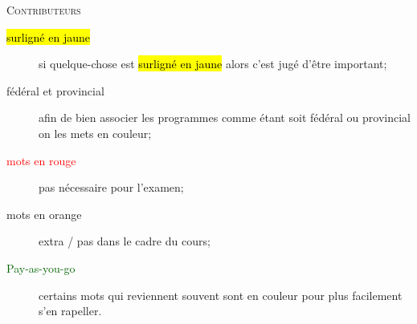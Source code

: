 \documentclass[10pt, french]{article}
\begin{document}
\begin{center}
	\textsc{\Large Contributeurs}\\[0.5cm] 
\end{center}


\begin{algo2}[Légende]
\begin{description}
	\item[\hl{surligné en jaune}]	si quelque-chose est \hl{surligné en jaune} alors c'est jugé d'être important; 
	\item[\textcolor{bulgarianrose}{fédéral} et \textcolor{blue(pigment)}{provincial}]	afin de bien associer les programmes comme étant soit \textcolor{bulgarianrose}{fédéral} ou \textcolor{blue(pigment)}{provincial} on les mets en couleur;
	\item[\textcolor{red}{mots en rouge}]	pas nécessaire pour l'examen;
	\item[\textcolor{burntorange}{mots en orange}]	extra / pas dans le cadre du cours;
	\item[\textcolor{darkgreen}{Pay-as-you-go}]	certains mots qui reviennent souvent sont en couleur pour plus facilement s'en rapeller.
\end{description}
\end{algo2}

\newpage
\end{document}
